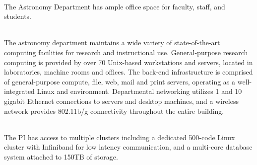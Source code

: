 \documentclass[prd,nofootbib,floatfix,11pt,tightenlines,nofootinbib]{revtex4}
\begin{document}
\\
The Astronomy Department has ample office
space for faculty, staff, and students. 

\\
The astronomy department maintains a wide variety of state-of-the-art
computing facilities for research and instructional use. General-purpose research computing is provided by over 70 
Unix-based workstations and servers, located in laboratories, machine rooms and offices. The
back-end infrastructure is comprised of general-purpose compute, file, web, mail and print
servers, operating as a well-integrated Linux and environment. Departmental
networking utilizes 1 and 10 gigabit Ethernet connections to servers and desktop machines, and a
wireless network provides 802.11b/g connectivity throughout the entire building.

\\
The PI has  access to multiple clusters including a dedicated 500-code Linux cluster with Infiniband for low latency
communication, and a multi-core database system attached to 150TB of
storage. 


\label{lastpage}
\end{document}
